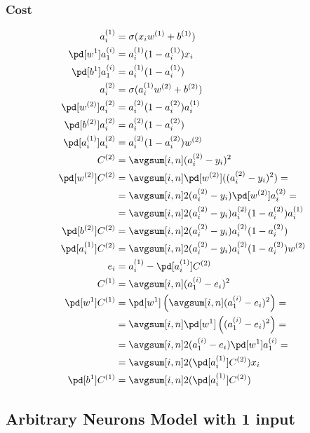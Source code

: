 \documentclass{article}
\begin{document}
\subsubsection{Cost}

\begin{align}
  a_i^{(1)} &= \sigma(x_iw^{(1)} + b^{(1)}) \\
  \pd[w^{1}]a_1^{(i)} &= a_i^{(1)}(1 - a_i^{(1)})x_i \\
  \pd[b^{1}]a_1^{(i)} &= a_i^{(1)}(1 - a_i^{(1)}) \\
  a_i^{(2)} &= \sigma(a_i^{(1)}w^{(2)} + b^{(2)}) \\
  \pd[w^{(2)}]a_i^{(2)} &= a_i^{(2)}(1 - a_i^{(2)})a_i^{(1)} \\
  \pd[b^{(2)}]a_i^{(2)} &= a_i^{(2)}(1 - a_i^{(2)}) \\
  \pd[a_i^{(1)}]a_i^{(2)} &= a_i^{(2)}(1 - a_i^{(2)})w^{(2)} \\
  C^{(2)} &= \avgsum[i, n] (a_i^{(2)} - y_i)^2 \\
  \pd[w^{(2)}] C^{(2)}
            &= \avgsum[i, n] \pd[w^{(2)}]((a_i^{(2)} - y_i)^2) = \\
            &= \avgsum[i, n] 2(a_i^{(2)} - y_i)\pd[w^{(2)}]a_i^{(2)} = \\
            &= \avgsum[i, n] 2(a_i^{(2)} - y_i)a_i^{(2)}(1 - a_i^{(2)})a_i^{(1)} \\
  \pd[b^{(2)}] C^{(2)} &= \avgsum[i, n] 2(a_i^{(2)} - y_i)a_i^{(2)}(1 - a_i^{(2)}) \\
  \pd[a_i^{(1)}]C^{(2)} &= \avgsum[i, n] 2(a_i^{(2)} - y_i)a_i^{(2)}(1 - a_i^{(2)})w^{(2)} \\
  e_i &= a_i^{(1)} - \pd[a_i^{(1)}]C^{(2)} \\
  C^{(1)} &= \avgsum[i, n] (a_1^{(i)} - e_i)^2 \\
  \pd[w^{1}]C^{(1)}
            &= \pd[w^{1}]\left(\avgsum[i, n] (a_1^{(i)} - e_i)^2\right) =\\
            &= \avgsum[i, n] \pd[w^{1}]\left((a_1^{(i)} - e_i)^2\right) =\\
            &= \avgsum[i, n] 2(a_1^{(i)} - e_i)\pd[w^{1}]a_1^{(i)} =\\
            &= \avgsum[i, n] 2(\pd[a_i^{(1)}]C^{(2)})x_i \\
  \pd[b^{1}]C^{(1)} &= \avgsum[i, n] 2(\pd[a_i^{(1)}]C^{(2)}) \\
\end{align}

\subsection{Arbitrary Neurons Model with 1 input}
\end{document}
